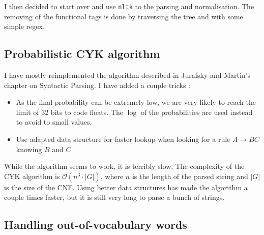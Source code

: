 \documentclass{article}
\begin{document}
I then decided to start over and use \texttt{nltk} to the parsing and
normalisation. The removing of the functional tags is done by traversing
the tree and with some simple regex.

\subsection{Probabilistic CYK algorithm}

I have mostly reimplemented the algorithm described in Jurafsky and Martin's
chapter on Syntactic Parsing. I have added a couple tricks :
\begin{itemize}
\item As the final probability can be extremely low, we are very likely to reach
  the limit of 32 bits to code floats. The $\log$ of the probabilities are used
  instead to avoid to small values.
\item Use adapted data structure for faster lookup when looking for a rule $A
  \rightarrow B C$ knowing $B$ and $C$\\
\end{itemize}

While the algorithm seems to work, it is terribly slow. The complexity of the
CYK algorithm is $\mathcal {O}(n^{3}\cdot |G|)$, where
$n$ is the length of the parsed string and $| G |$ is the size of the CNF. Using
better data structures has made the algorithm a couple times faster, but it is
still very long to parse a bunch of strings.

\subsection{Handling out-of-vocabulary words}
\end{document}
